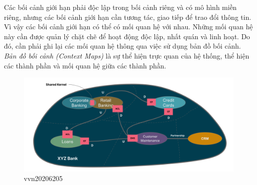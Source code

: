 Các bối cảnh giới hạn phải độc lập trong bối cảnh riêng và có mô hình miền riêng, nhưng các bối cảnh giới hạn cần tương tác, giao tiếp để trao đổi thông tin. Vì vậy các bối cảnh giới hạn có thể có mối quan hệ với nhau. Những mối quan hệ này cần được quản lý chặt chẽ để hoạt động độc lập, nhất quán và linh hoạt. Do đó, cần phải ghi lại các mối quan hệ thông qua việc sử dụng bản đồ bối cảnh. \emph{Bản đồ bối cảnh (Context Maps)} là sự thể hiện trực quan của hệ thống, thể hiện các thành phần và mối quan hệ giữa các thành phần.


\begin{figure}[H]

    \centering
    
    \includegraphics[scale = 0.5]{pictures/ban_do_boi_canh/main.drawio.png}
    
    \caption{vvn20206205}
    
    \end{figure}